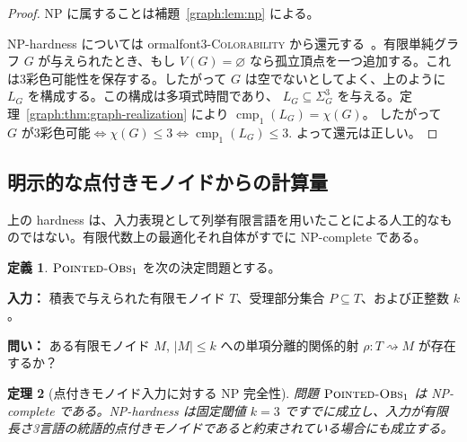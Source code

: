 \documentclass[10pt,a4paper]{ltjsarticle}
\newtheorem{theorem}{定理}[section]
\theoremstyle{definition}
\newtheorem{definition}[theorem]{定義}
\theoremstyle{remark}
\newcommand{\cmp}{\operatorname{cmp}}
\newcommand{\relto}{\mathrel{\rightsquigarrow}}
\begin{document}
\begin{proof}
NP に属することは補題~\ref{graph:lem:np} による。

NP-hardness については {
ormalfont\textsc{3-Colorability}} から還元する~\cite{GareyJohnson1979}。有限単純グラフ $G$ が与えられたとき、もし $V(G)=\varnothing$ なら孤立頂点を一つ追加する。これは3彩色可能性を保存する。したがって $G$ は空でないとしてよく、上のように $L_G$ を構成する。この構成は多項式時間であり、
\(L_G\subseteq\Sigma_G^3\)
を与える。定理~\ref{graph:thm:graph-realization} により
\(\cmp_1(L_G)=\chi(G)\)。
したがって
\(
G\text{ が3彩色可能}
\iff \chi(G)\le3
\iff \cmp_1(L_G)\le3.
\)
よって還元は正しい。
\end{proof}

\subsection{明示的な点付きモノイドからの計算量}

上の hardness は、入力表現として列挙有限言語を用いたことによる人工的なものではない。有限代数上の最適化それ自体がすでに NP-complete である。

\begin{definition}
\({\normalfont\textsc{Pointed-Obs}}_1\)
を次の決定問題とする。

\medskip
\noindent
\textbf{入力：} 積表で与えられた有限モノイド \(T\)、受理部分集合 \(P\subseteq T\)、および正整数 \(k\)。

\noindent
\textbf{問い：} ある有限モノイド \(M\), \(|M|\le k\) への単項分離的関係的射
\(\rho:T\relto M\)
が存在するか？
\end{definition}

\begin{theorem}[点付きモノイド入力に対する NP 完全性]
\label{graph:thm:pointed-npcomplete}
問題 \({\normalfont\textsc{Pointed-Obs}}_1\) は NP-complete である。NP-hardness は固定閾値 $k=3$ ですでに成立し、入力が有限長さ3言語の統語的点付きモノイドであると約束されている場合にも成立する。
\end{theorem}
\end{document}
